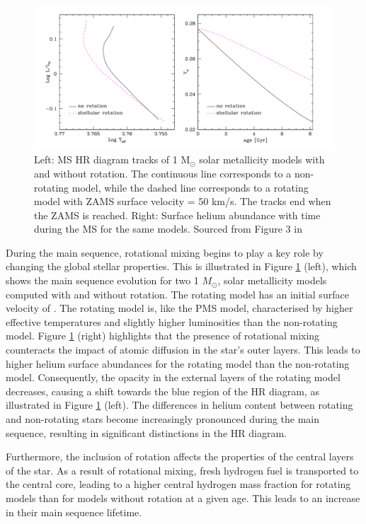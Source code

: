 \begin{figure}[h]
    \includegraphics[width=\textwidth]{Figures/intro_figures/MS_effect.png}
    \caption[Effect of rotation of main-sequence evoltuon of a stars 1 $M_{\odot}$]{Left: MS HR diagram tracks of 1 M$_{\odot}$ solar metallicity models with and without rotation. The continuous line corresponds to a non-rotating model, while the dashed line corresponds to a rotating model with ZAMS surface velocity = 50 km/s. The tracks end when the ZAMS is reached. Right: Surface helium abundance with time during the MS for the same models. Sourced from Figure 3 in \citet{eggenberger_rotation_2013}}
    \label{fig:ms_effect}
\end{figure}

During the main sequence, rotational mixing begins to play a key role by changing the global stellar
properties. 
This is illustrated in Figure \ref{fig:ms_effect} (left), which shows the main sequence evolution for two 1 $M_{\odot}$, solar metallicity models computed with and without rotation.
The rotating model has an initial surface velocity of .
The rotating model is, like the PMS model, characterised by higher effective temperatures and slightly higher luminosities than the non-rotating model.
Figure \ref{fig:ms_effect} (right) highlights that the presence of rotational mixing counteracts the impact of atomic diffusion in the star's outer layers. 
This leads to higher helium surface abundances for the rotating model than the non-rotating model.
Consequently, the opacity in the external layers of the rotating model decreases, causing a shift towards the blue region of the HR diagram, as illustrated in Figure \ref{fig:ms_effect} (left). 
The differences in helium content between rotating and non-rotating stars become increasingly pronounced during the main sequence, resulting in significant distinctions in the HR diagram.

Furthermore, the inclusion of rotation affects the properties of the central layers of the star. As a result of rotational mixing, fresh hydrogen fuel is transported to the central core, leading to a higher central hydrogen mass fraction for rotating models than for models without rotation at a given age. This leads to an increase in their main sequence lifetime.

